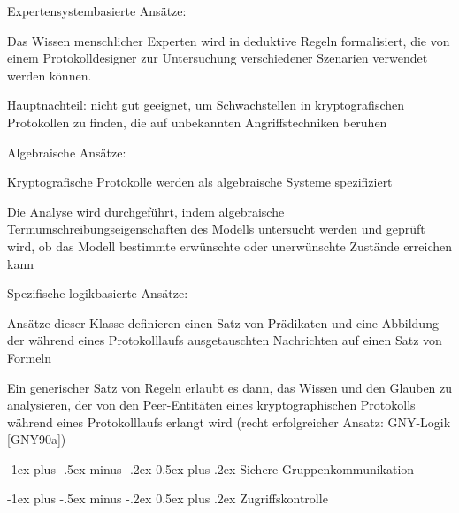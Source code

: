 \documentclass[a4paper]{article}
\makeatletter
\renewcommand{\section}{\@startsection{section}{1}{0mm}%
 {-1ex plus -.5ex minus -.2ex}%
 {0.5ex plus .2ex}%
 {\normalfont\large\bfseries}}
\makeatother
\begin{document}
\begin{multicols}{3}
\begin{itemize*}
            \begin{itemize*}
                  \item Expertensystembasierte Ansätze:
                  \begin{itemize*} \item Das Wissen menschlicher Experten wird in deduktive Regeln formalisiert, die von einem Protokolldesigner zur Untersuchung verschiedener Szenarien verwendet werden können. \item Hauptnachteil: nicht gut geeignet, um Schwachstellen in kryptografischen Protokollen zu finden, die auf unbekannten Angriffstechniken beruhen \end{itemize*}
                  \item Algebraische Ansätze:
                  \begin{itemize*} \item Kryptografische Protokolle werden als algebraische Systeme spezifiziert \item Die Analyse wird durchgeführt, indem algebraische Termumschreibungseigenschaften des Modells untersucht werden und geprüft wird, ob das Modell bestimmte erwünschte oder unerwünschte Zustände erreichen kann \end{itemize*}
                  \item Spezifische logikbasierte Ansätze:
                  \begin{itemize*} \item Ansätze dieser Klasse definieren einen Satz von Prädikaten und eine Abbildung der während eines Protokolllaufs ausgetauschten Nachrichten auf einen Satz von Formeln \item Ein generischer Satz von Regeln erlaubt es dann, das Wissen und den Glauben zu analysieren, der von den Peer-Entitäten eines kryptographischen Protokolls während eines Protokolllaufs erlangt wird (recht erfolgreicher Ansatz: GNY-Logik {[}GNY90a{]}) \end{itemize*}
            \end{itemize*}
      \end{itemize*}


      \section{Sichere
        Gruppenkommunikation}


      \section{Zugriffskontrolle}



\end{multicols}
\end{document}
